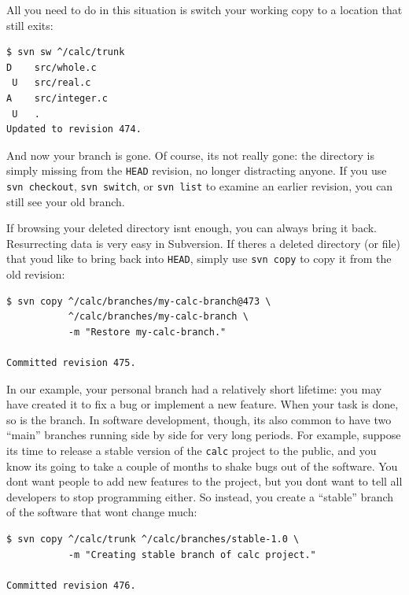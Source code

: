 All you need to do in this situation is switch your working copy to a
location that still exits:

\begin{verbatim}
$ svn sw ^/calc/trunk
D    src/whole.c
 U   src/real.c
A    src/integer.c
 U   .
Updated to revision 474.
\end{verbatim}

And now your branch is gone. Of course, it\textquotesingle s not really
gone: the directory is simply missing from the \texttt{HEAD} revision,
no longer distracting anyone. If you use \texttt{svn\ checkout},
\texttt{svn\ switch}, or \texttt{svn\ list} to examine an earlier
revision, you can still see your old branch.

If browsing your deleted directory isn\textquotesingle t enough, you can
always bring it back. Resurrecting data is very easy in Subversion. If
there\textquotesingle s a deleted directory (or file) that
you\textquotesingle d like to bring back into \texttt{HEAD}, simply use
\texttt{svn\ copy} to copy it from the old revision:

\begin{verbatim}
$ svn copy ^/calc/branches/my-calc-branch@473 \
           ^/calc/branches/my-calc-branch \
           -m "Restore my-calc-branch."

Committed revision 475.
\end{verbatim}

In our example, your personal branch had a relatively short lifetime:
you may have created it to fix a bug or implement a new feature. When
your task is done, so is the branch. In software development, though,
it\textquotesingle s also common to have two ``main'' branches running
side by side for very long periods. For example, suppose
it\textquotesingle s time to release a stable version of the
\texttt{calc} project to the public, and you know it\textquotesingle s
going to take a couple of months to shake bugs out of the software. You
don\textquotesingle t want people to add new features to the project,
but you don\textquotesingle t want to tell all developers to stop
programming either. So instead, you create a ``stable'' branch of the
software that won\textquotesingle t change much:

\begin{verbatim}
$ svn copy ^/calc/trunk ^/calc/branches/stable-1.0 \
           -m "Creating stable branch of calc project."

Committed revision 476.
\end{verbatim}

